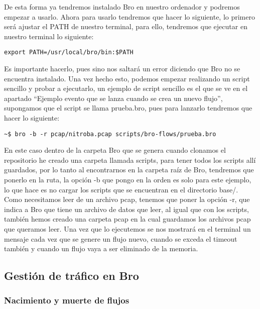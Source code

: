 De esta forma ya tendremos instalado Bro en nuestro ordenador y podremos empezar 
a usarlo.
\intro
Ahora para usarlo tendremos que hacer lo siguiente, lo primero será ajustar el 
PATH de nuestro terminal, para ello, tendremos que ejecutar en nuestro terminal 
lo siguiente:
\intro
\begin{verbatim}
export PATH=/usr/local/bro/bin:$PATH
\end{verbatim}

Es importante hacerlo, pues sino nos saltará un error diciendo que Bro no se 
encuentra instalado. Una vez hecho esto, podemos empezar realizando un script 
sencillo y probar a ejecutarlo, un ejemplo de script sencillo es el que se ve 
en el apartado “Ejemplo evento que se lanza cuando se crea un nuevo flujo”, 
supongamos que el script se llama prueba.bro, pues para lanzarlo tendremos 
que hacer lo siguiente:
\intro
\begin{verbatim}
~$ bro -b -r pcap/nitroba.pcap scripts/bro-flows/prueba.bro
\end{verbatim}

En este caso dentro de la carpeta Bro que se genera cuando clonamos el 
repositorio he creado una carpeta llamada scripts, para tener todos los 
scripts allí guardados, por lo tanto al encontrarnos en la carpeta raíz 
de Bro, tendremos que ponerlo en la ruta, la opción -b que pongo en la 
orden es solo para este ejemplo, lo que hace es no cargar los scripts 
que se encuentran en el directorio base/. Como necesitamos leer de un 
archivo pcap, tenemos que poner la opción -r, que indica a Bro que tiene 
un archivo de datos que leer, al igual que con los scripts, también hemos 
creado una carpeta pcap en la cual guardamos los archivos pcap que queramos 
leer. Una vez que lo ejecutemos se nos mostrará en el terminal un mensaje 
cada vez que se genere un flujo nuevo, cuando se exceda el timeout también 
y cuando un flujo vaya a ser eliminado de la memoria.

\subsection{Gestión de tráfico en Bro}

\subsubsection{Nacimiento y muerte de flujos}

